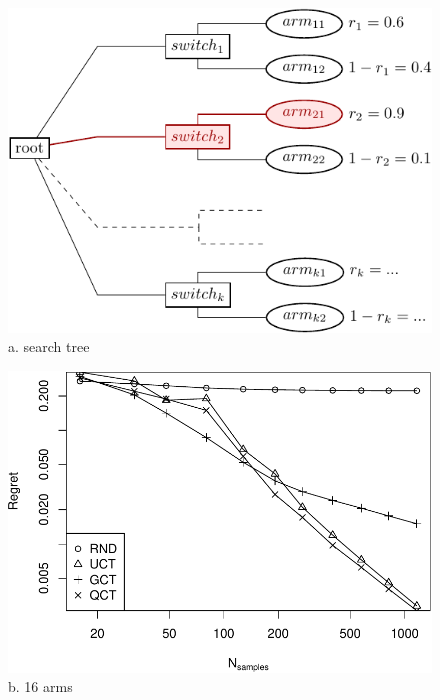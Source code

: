 \documentclass{article}
\begin{document}
\begin{figure}
  \begin{minipage}[c]{0.5\linewidth}
    \centering
    \includegraphics[scale=0.8]{twolevel-tree.pdf}\\
    a. search tree
  \end{minipage}
  \begin{minipage}[c]{0.5\linewidth}
    \centering
    \includegraphics[scale=0.4]{tree-identity-k=16-uqb=8.pdf}\\ 
    b. 16 arms \\
    \vspace{1em}

\end{minipage}
\end{figure}
\end{document}
